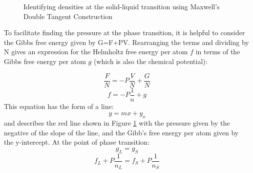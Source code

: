 \documentclass[double,12pt]{beavtex}
\begin{document}
\begin{figure}[h!]
    \centering
    \caption{Identifying densities at the solid-liquid transition using Maxwell's Double Tangent Construction}
    \label{fig:MaxwellDT}
  \end{figure}

To facilitate finding the pressure at the phase transition, %
it is helpful to consider the Gibbs free energy given by G=F+PV. Rearranging the terms and dividing by N gives an  expression for the Helmholtz free energy per atom $f$ in terms of the Gibbs free energy per atom  $g$ (which is also the chemical potential):  %

\begin{displaymath}{\frac{F}{N}=-P\frac{V}{N}+\frac{G}{N}}\end{displaymath} 
\begin{displaymath}{f=-P\frac{1}{n}+g}\end{displaymath}
\noindent This equation has the form of a line:
\begin{displaymath}{y=mx+y_o}\end{displaymath}
\noindent and describes the red line shown in Figure \ref{fig:MaxwellDT} with the pressure given by the negative of the slope of the line, and the Gibb's free energy per atom given by the y-intercept. At the point of phase transition:
\begin{displaymath}{g_L=g_S}\end{displaymath} 
\begin{displaymath}{f_L+P\frac{1}{n_L}=f_S+P\frac{1}{n_S}}\end{displaymath}
\end{document}
